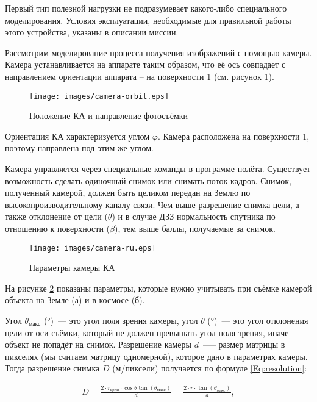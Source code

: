 \documentclass[12pt,a4paper]{article}
\begin{document}
Первый тип полезной нагрузки не подразумевает какого-либо специального
моделирования. Условия эксплуатации, необходимые для правильной работы этого устройства,
указаны в описании миссии.

Рассмотрим моделирование процесса получения изображений с помощью камеры. Камера
устанавливается на аппарате таким образом, что её ось совпадает с направлением ориентации
аппарата – на поверхности 1 (см. рисунок \ref{Pic:Camera-Orbit}).

\begin{figure}[tbh]
  \begin{center}
    \texttt{[image: images/camera-orbit.eps]}
    \caption{Положение КА и направление фотосъёмки}
    \label{Pic:Camera-Orbit}
  \end{center}
\end{figure}

Ориентация КА характеризуется углом $\varphi$. Камера расположена на поверхности 1, поэтому
направлена под этим же углом.

Камера управляется через специальные команды в программе полёта. Существует возможность
сделать одиночный снимок или снимать поток кадров. Снимок, полученный камерой,  должен
быть целиком передан на Землю по высокопроизводительному каналу связи. Чем выше разрешение
снимка цели, а также отклонение от цели ($\theta$) и в случае ДЗЗ нормальность спутника по
отношению к поверхности ($\beta$), тем выше баллы, получаемые за снимок.

\begin{figure}[tbh]
  \begin{center}
    \texttt{[image: images/camera-ru.eps]}
    \caption{Параметры камеры КА}
    \label{Pic:Camera}
  \end{center}
\end{figure}

На рисунке \ref{Pic:Camera} показаны параметры, которые нужно учитывать при съёмке камерой
объекта на Земле (а) и в космосе (б).

Угол $\theta_{\text{макс}}$ (°)~--- это угол поля зрения камеры, угол $\theta$ (°)~--- это
угол отклонения цели от оси съёмки, который не должен превышать угол поля зрения, иначе
объект не попадёт на снимок. Разрешение камеры $d$~--— размер матрицы в пикселях (мы
считаем матрицу одномерной), которое дано в параметрах камеры. Тогда разрешение снимка $D$
(м/пиксели) получается по формуле \ref{Eq:resolution}:

\begin{eqnarray}
  D = \frac{2 \cdot r_{\text{цели}}\cdot \cos{\theta}\tan{\left(\theta_{\text{макс}}\right)}}{d} =
  \frac{2 \cdot r \cdot \tan{\left(\theta_{\text{макс}}\right)}}{d},
  \label{Eq:resolution}
\end{eqnarray}
\end{document}
